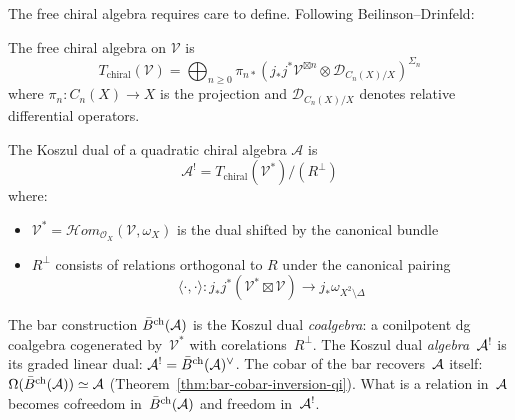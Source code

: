 The free chiral algebra requires care to define. Following Beilinson--Drinfeld:

\begin{definition}
The free chiral algebra on $\mathcal{V}$ is
\[
T_{\text{chiral}}(\mathcal{V}) = \bigoplus_{n \geq 0} \pi_{n*}\left(j_*j^*\mathcal{V}^{\boxtimes n} \otimes \mathcal{D}_{C_n(X)/X}\right)^{\Sigma_n}
\]
where $\pi_n: C_n(X) \to X$ is the projection and $\mathcal{D}_{C_n(X)/X}$ denotes relative differential operators.
\end{definition}

\begin{definition}
The Koszul dual of a quadratic chiral algebra $\mathcal{A}$ is
\[
\mathcal{A}^! = T_{\text{chiral}}(\mathcal{V}^*)/(R^{\perp})
\]
where:
\begin{itemize}
\item $\mathcal{V}^* = \mathcal{H}om_{\mathcal{O}_X}(\mathcal{V}, \omega_X)$ is the dual shifted by the canonical bundle
\item $R^{\perp}$ consists of relations orthogonal to $R$ under the canonical pairing
\[
\langle \cdot, \cdot \rangle: j_*j^*(\mathcal{V}^* \boxtimes \mathcal{V}) \to j_*\omega_{X^2 \setminus \Delta}
\]
\end{itemize}
\end{definition}

\begin{remark}\label{rem:koszul-dual-meaning}
The bar construction $\bar{B}^{\mathrm{ch}}(\mathcal{A})$ is the Koszul dual \emph{coalgebra}: a conilpotent dg coalgebra cogenerated by~$\mathcal{V}^*$ with corelations~$R^{\perp}$.  The Koszul dual \emph{algebra}~$\mathcal{A}^!$ is its graded linear dual: $\mathcal{A}^! = \bar{B}^{\mathrm{ch}}(\mathcal{A})^\vee$.  The cobar of the bar recovers~$\mathcal{A}$ itself: $\Omega(\bar{B}^{\mathrm{ch}}(\mathcal{A})) \simeq \mathcal{A}$ (Theorem~\ref{thm:bar-cobar-inversion-qi}).  What is a relation in~$\mathcal{A}$ becomes cofreedom in~$\bar{B}^{\mathrm{ch}}(\mathcal{A})$ and freedom in~$\mathcal{A}^!$.
\end{remark}

